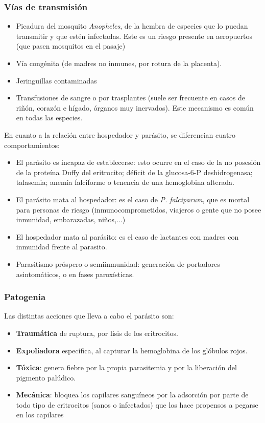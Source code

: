 \subsubsection{Vías de transmisión}
\begin{itemize}[itemsep=0pt,parsep=0pt,topsep=0pt,partopsep=0pt]
	\item Picadura del mosquito \textit{Anopheles}, de la hembra de especies que lo puedan transmitir y que estén infectadas. Este es un riesgo presente en aeropuertos (que pasen mosquitos en el pasaje)
	\item Vía congénita (de madres no inmunes, por rotura de la placenta).
	\item Jeringuillas contaminadas
	\item Transfusiones de sangre o por trasplantes (suele ser frecuente en casos de riñón, corazón e hígado, órganos muy inervados). Este mecanismo es común en todas las especies.
\end{itemize}

En cuanto a la relación entre hospedador y parásito, se diferencian cuatro comportamientos:
\begin{itemize}[itemsep=0pt,parsep=0pt,topsep=0pt,partopsep=0pt]
	\item El parásito es incapaz de establecerse: esto ocurre en el caso de la no posesión de la proteína Duffy del eritrocito; déficit de la glucosa-6-P deshidrogenasa; talasemia; anemia falciforme o tenencia de una hemoglobina alterada.
	\item El parásito mata al hospedador: es el caso de \textit{P. falciparum}, que es mortal para personas de riesgo (inmunocomprometidos, viajeros o gente que no posee inmunidad, embarazadas, niños,$\dots$)
	\item El hospedador mata al parásito: es el caso de lactantes con madres con inmunidad frente al parasito.
	\item Parasitismo próspero o semiinmunidad: generación de portadores asintomáticos, o en fases paroxísticas.
\end{itemize}
\subsubsection{Patogenia}
Las distintas acciones que lleva a cabo el parásito son:
\begin{itemize}[itemsep=0pt,parsep=0pt,topsep=0pt,partopsep=0pt]
	\item \textbf{Traumática} de ruptura, por lisis de los eritrocitos.
	\item \textbf{Expoliadora} específica, al capturar la hemoglobina de los glóbulos rojos.
	\item \textbf{Tóxica}: genera fiebre por la propia parasitemia y por la liberación del pigmento palúdico.
	\item \textbf{Mecánica}: bloquea los capilares sanguíneos por la adsorción por parte de todo tipo de eritrocitos (sanos o infectados) que los hace propensos a pegarse en los capilares
\end{itemize}

